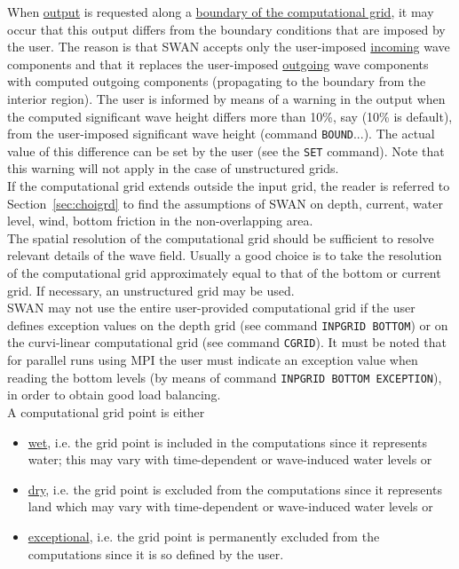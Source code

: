 \documentclass[12pt]{book}
\begin{document}
\noindent
When \underline{output} is requested along a \underline{boundary of the computational grid}, it may occur
that this output differs from the boundary conditions that are imposed by the user. The reason is that
SWAN accepts only the user-imposed \underline{incoming} wave components and that it replaces the user-imposed
\underline{outgoing} wave components with computed outgoing components (propagating to the boundary from
the interior region). The user is informed by means of a warning in the output when the
computed significant wave height differs more than 10\%, say (10\% is default), from the user-imposed
significant wave height (command {\tt BOUND}...). The actual value of this difference can be set by the
user (see the {\tt SET} command). Note that this warning will not apply in the case of unstructured grids.
\\[2ex]
\noindent
If the computational grid extends outside the input grid, the reader is referred to Section~\ref{sec:choigrd}
to find the assumptions of SWAN on depth, current, water level, wind, bottom friction in the non-overlapping area.
\\[2ex]
\noindent
The spatial resolution of the computational grid should be sufficient to resolve relevant details of the wave
field. Usually a good choice is to take the resolution of the computational grid approximately equal to that
of the bottom or current grid. If necessary, an unstructured grid may be used.
\\[2ex]
\noindent
SWAN may not use the entire user-provided computational grid if the user defines exception values on
the depth grid (see command {\tt INPGRID BOTTOM}) or on the curvi-linear computational grid (see command
{\tt CGRID}).
It must be noted that for parallel runs using MPI the user must indicate an exception value when
reading the bottom levels (by means of command {\tt INPGRID BOTTOM EXCEPTION}), in order to obtain
good load balancing.
\\[2ex]
\noindent
A computational grid point is either
\begin{itemize}
  \item \underline{wet}, i.e. the grid point is included in the computations since it represents water; this may vary
         with time-dependent or wave-induced water levels or
  \item \underline{dry}, i.e. the grid point is excluded from the computations since it represents land which may vary
        with time-dependent or wave-induced water levels or
  \item \underline{exceptional}, i.e. the grid point is permanently excluded from the computations since it is so
        defined by the user.
\end{itemize}
\end{document}
